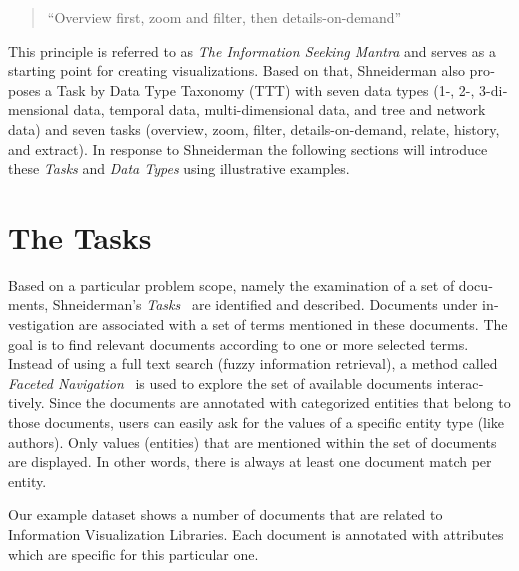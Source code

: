 \begin{english}
\begin{quotation}
    ``Overview first, zoom and filter, then details-on-demand''
\end{quotation}

\SuperPar This principle is referred to as \emph{The Information Seeking Mantra} and serves as a starting point for creating visualizations. Based on that, Shneiderman also proposes a Task by Data Type Taxonomy (TTT) with seven data types (1-, 2-, 3-dimensional data, temporal data, multi-dimensional data, and tree and network data) and seven tasks (overview, zoom, filter, details-on-demand, relate, history, and extract). In response to Shneiderman the following sections will introduce these \emph{Tasks} and \emph{Data Types} using illustrative examples.

\section{The Tasks} %
\label{sec:tasks}


Based on a particular problem scope, namely the examination of a set of documents, Shneiderman's \emph{Tasks}~\cite{shneiderman96eyes} are identified and described. Documents under investigation are associated with a set of terms mentioned in these documents. The goal is to find relevant documents according to one or more selected terms. Instead of using a full text search (fuzzy information retrieval), a method called \emph{Faceted Navigation}~\cite{Huynh09} is used to explore the set of available documents interactively. Since the documents are annotated with categorized entities that belong to those documents, users can easily ask for the values of a specific entity type (like authors). Only values (entities) that are mentioned within the set of documents are displayed. In other words, there is always at least one document match per entity.



Our example dataset shows a number of documents that are related to Information Visualization Libraries. Each document is annotated with attributes which are specific for this particular one.


\end{english}
